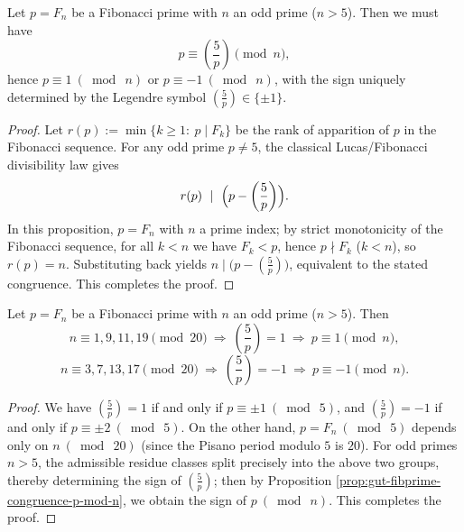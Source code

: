 \begin{proposition}\label{prop:gut-fibprime-congruence-p-mod-n}
Let \(p=F_n\) be a Fibonacci prime with \(n\) an odd prime (\(n>5\)).
Then we must have
\[
p \equiv \left(\frac{5}{p}\right)\pmod n,
\]
hence \(p\equiv 1\ (\bmod\ n)\) or \(p\equiv -1\ (\bmod\ n)\), with the sign uniquely determined by the Legendre symbol \(\left(\frac{5}{p}\right)\in\{\pm 1\}\).
\end{proposition}
\begin{proof}
Let \(r(p):=\min\{k\ge 1:\ p\mid F_k\}\) be the rank of apparition of \(p\) in the Fibonacci sequence.
For any odd prime \(p\neq 5\), the classical Lucas/Fibonacci divisibility law gives
\[
r(p)\ \mid\ \Bigl(p-\left(\frac{5}{p}\right)\Bigr).
\]
In this proposition, \(p=F_n\) with \(n\) a prime index; by strict monotonicity of the Fibonacci sequence, for all \(k<n\) we have \(F_k<p\), hence \(p\nmid F_k\) (\(k<n\)), so \(r(p)=n\).
Substituting back yields \(n\mid\bigl(p-(\frac{5}{p})\bigr)\), equivalent to the stated congruence. This completes the proof.
\end{proof}

\begin{corollary}\label{cor:gut-fibprime-sign-by-n-mod20}
Let \(p=F_n\) be a Fibonacci prime with \(n\) an odd prime (\(n>5\)).
Then
\[
n\equiv 1,9,11,19\pmod{20}\ \Longrightarrow\ \left(\frac{5}{p}\right)=1\ \Longrightarrow\ p\equiv 1\pmod n,
\]
\[
n\equiv 3,7,13,17\pmod{20}\ \Longrightarrow\ \left(\frac{5}{p}\right)=-1\ \Longrightarrow\ p\equiv -1\pmod n.
\]
\end{corollary}
\begin{proof}
We have \(\left(\frac{5}{p}\right)=1\) if and only if \(p\equiv \pm 1\ (\bmod\ 5)\), and \(\left(\frac{5}{p}\right)=-1\) if and only if \(p\equiv \pm 2\ (\bmod\ 5)\).
On the other hand, \(p=F_n\ (\bmod\ 5)\) depends only on \(n\ (\bmod\ 20)\) (since the Pisano period modulo \(5\) is \(20\)).
For odd primes \(n>5\), the admissible residue classes split precisely into the above two groups, thereby determining the sign of \(\left(\frac{5}{p}\right)\);
then by Proposition \ref{prop:gut-fibprime-congruence-p-mod-n}, we obtain the sign of \(p\ (\bmod\ n)\). This completes the proof.
\end{proof}

